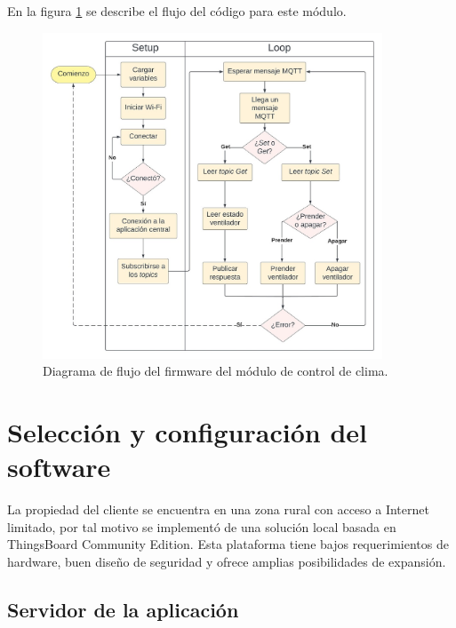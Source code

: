 En la figura \ref{fig:flow_climacontrol} se describe el flujo del código para este módulo.

\begin{figure}[!h]
	\centering
	\includegraphics[width=0.9\textwidth]{./Figures/chapter3/FirmwareVentControl.jpg}
	\caption[Diagrama de flujo del firmware del módulo de control de clima]{Diagrama de flujo del firmware del módulo de control de clima.}
	\label{fig:flow_climacontrol}
\end{figure}










\pagebreak
\section{Selección y configuración del software}
\label{sec:Selección y configuración del software}

La propiedad del cliente se encuentra en una zona rural con acceso a Internet limitado, por tal motivo se implementó de una solución local basada en  ThingsBoard Community Edition.
Esta plataforma tiene bajos requerimientos de hardware, buen diseño de seguridad y ofrece amplias posibilidades de expansión.

\subsection{Servidor de la aplicación}
\label{sec:Servidor de la aplicación}

